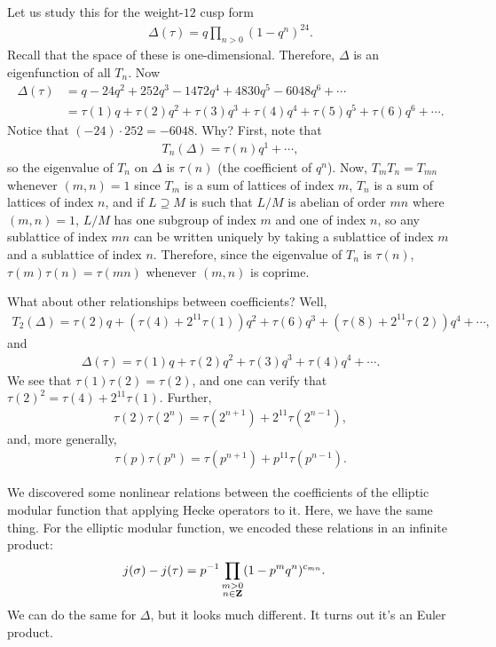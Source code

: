 \documentclass[11pt, oneside,margin=1in]{article}
\begin{document}
Let us study this for the weight-$12$ cusp form 
\begin{align*}
	\Delta(\tau) = q \prod_{n>0}  (1-q^n)^{24}.
\end{align*}
Recall that the space of these is one-dimensional. Therefore, $\Delta$ is an eigenfunction of all $T_n$. Now
\begin{align*}
	\Delta (\tau) &= q - 24q^2+252q^3 - 1472q^4 + 4830q^5 - 6048q^6 + \cdots\\
		      &= \tau(1)q + \tau (2)q^2 + \tau (3)q^3 + \tau (4)q^4 + \tau (5)q^5 + \tau (6)q^6 + \cdots.
\end{align*}
Notice that $(-24)\cdot 252= -6048$. Why? First, note that
\begin{align*}
	T_n(\Delta) = \tau (n) q^1 + \cdots,
\end{align*}
so the eigenvalue of $T_n$ on $\Delta$ is $\tau(n)$ (the coefficient of $q^n$). Now, $T_mT_n = T_{mn}$ whenever $(m,n)=1$ since $T_m$ is a sum of lattices of index $m$, $T_n$ is a sum of lattices of index $n$, and if $L\supseteq M$ is such that $L/M$ is abelian of order $mn$ where $(m,n)=1$, $L/M$ has one subgroup of index $m$ and one of index $n$, so any sublattice of index $mn$ can be written uniquely by taking a sublattice of index $m$ and a sublattice of index $n$. Therefore, since the eigenvalue of $T_n$ is $\tau(n)$, $\tau(m)\tau (n)= \tau (mn)$ whenever $(m,n)$ is coprime.

What about other relationships between coefficients? Well,
\begin{align*}
	T_2(\Delta) = \tau (2)q +  (\tau(4)+ 2^{11}\tau (1)) q^2 + \tau(6)q^3 +  (\tau(8)+2^{11}\tau (2)) q^4 + \cdots,
\end{align*}
and
\begin{align*}
	\Delta(\tau) = \tau (1) q + \tau (2)q^2 + \tau (3)q^3 + \tau (4)q^4 +\cdots.
\end{align*}
We see that  $\tau(1)\tau(2) = \tau(2)$, and one can verify that $\tau(2)^2 = \tau (4) + 2^{11} \tau (1)$. Further,
\begin{align*}
	\tau(2) \tau (2^n) = \tau (2^{n+1}) +  2^{11}\tau (2^{n-1}),
\end{align*}
and, more generally,
\begin{align*}
	\tau(p)\tau (p^n) = \tau(p^{n+1}) + p^{11} \tau (p^{n-1}).
\end{align*}

We discovered some nonlinear relations between the coefficients of the elliptic modular function that applying Hecke operators to it. Here, we have the same thing. For the elliptic modular function, we encoded these relations in an infinite product:
\begin{align*}
	j(\sigma)-j(\tau) &= p^{-1} \prod_{\substack{ m > 0\\n\in \mathbf Z}} (1-p^mq^n)^{c_{mn}}.
\end{align*}
We can do the same for $\Delta$, but it looks much different. It turns out it's an Euler product.
\end{document}
